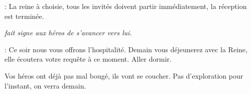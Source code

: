 \begin{quotebox}
\noindent\textbf{}: La reine à choisie, tous les invités doivent partir immédiatement, la réception est terminée.

\emph{ fait signe aux héros de s’avancer vers lui.}

\noindent\textbf{}: Ce soir nous vous offrons l’hospitalité. Demain vous déjeunerez avec la Reine, elle écoutera votre requête à ce moment. Aller dormir.
\end{quotebox}

Vos héros ont déjà pas mal bougé, ils vont se coucher. Pas d’exploration pour l’instant, on verra demain.
